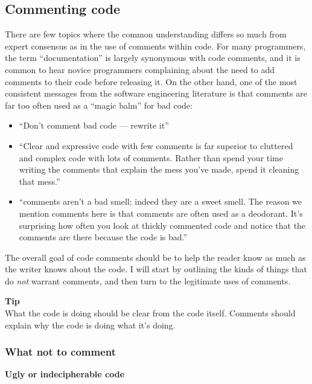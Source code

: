 \subsection{Commenting code}

There are few topics where the common understanding differs so much from expert consensus as in the use of comments within code.
For many programmers, the term ``documentation'' is largely synonymous with code comments, and it is common to hear novice programmers complaining about the need to add comments to their code before releasing it.
On the other hand, one of the most consistent messages from the software engineering literature is that comments are far too often used as a ``magic balm'' for bad code:

\begin{itemize}
\item ``Don't comment bad code --- rewrite it'' \citep{Kernighan:1978aa}
\item ``Clear and expressive code with few comments is far superior to cluttered and complex code with lots of comments. Rather than spend your time writing the comments that explain the mess you’ve made, spend it cleaning that mess.'' \citep{Martin:2025aa}
\item ``comments aren't a bad smell; indeed they are a sweet smell. The reason we mention comments here is that comments are often used as a deodorant. It's surprising how often you look at thickly commented code and notice that the comments are there because the code is bad.'' \citep{Fowler:1999aa}
\end{itemize}

The overall goal of code comments should be to help the reader know as much as the writer knows about the code.
I will start by outlining the kinds of things that do \textit{not} warrant comments, and then turn to the legitimate uses of comments.

\begin{framed}
\textbf{Tip}\\
What the code is doing should be clear from the code itself. Comments should explain why the code is doing what it's doing.  
\end{framed}

\subsubsection{What not to comment}

\textbf{Ugly or indecipherable code}

